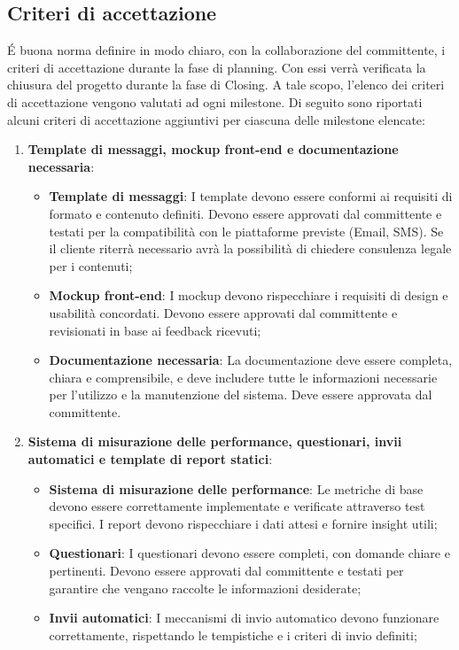 \documentclass[a4paper,12pt, openright]{report}
\begin{document}
\subsection{Criteri di accettazione}
É buona norma definire in modo chiaro, con la collaborazione del committente, i criteri di accettazione durante la fase di planning. Con essi verrà verificata la chiusura del progetto durante la fase di Closing. A tale scopo, l'elenco dei criteri di accettazione vengono valutati ad ogni milestone. Di seguito sono riportati alcuni criteri di accettazione aggiuntivi per ciascuna delle milestone elencate:
\begin{enumerate}
    \item \textbf{Template di messaggi, mockup front-end e documentazione necessaria}:
    \begin{itemize}
        \item \textbf{Template di messaggi}: I template devono essere conformi ai requisiti di formato e contenuto definiti. Devono essere approvati dal committente e testati per la compatibilità con le piattaforme previste (Email, SMS). Se il cliente riterrà necessario avrà la possibilità di chiedere consulenza legale per i contenuti;
        \item \textbf{Mockup front-end}: I mockup devono rispecchiare i requisiti di design e usabilità concordati. Devono essere approvati dal committente e revisionati in base ai feedback ricevuti;
        \item \textbf{Documentazione necessaria}: La documentazione deve essere completa, chiara e comprensibile, e deve includere tutte le informazioni necessarie per l'utilizzo e la manutenzione del sistema. Deve essere approvata dal committente.
    \end{itemize}
    \item \textbf{Sistema di misurazione delle performance, questionari, invii automatici e template di report statici}:
    \begin{itemize}
        \item \textbf{Sistema di misurazione delle performance}: Le metriche di base devono essere correttamente implementate e verificate attraverso test specifici. I report devono rispecchiare i dati attesi e fornire insight utili;
        \item \textbf{Questionari}: I questionari devono essere completi, con domande chiare e pertinenti. Devono essere approvati dal committente e testati per garantire che vengano raccolte le informazioni desiderate;
        \item \textbf{Invii automatici}: I meccanismi di invio automatico devono funzionare correttamente, rispettando le tempistiche e i criteri di invio definiti;

\end{itemize}
\end{enumerate}
\end{document}
